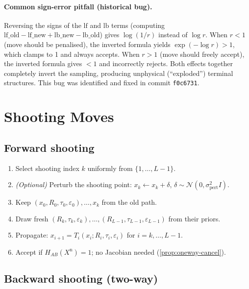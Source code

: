 \documentclass[11pt,a4paper]{article}
\newcommand{\N}{\mathcal{N}}
\newcommand{\HAB}{H_{AB}}
\newcommand{\Xnew}{X^{\mathrm{n}}}
\begin{document}
\paragraph{Common sign-error pitfall (historical bug).}
Reversing the signs of the $\mathrm{lf}$ and $\mathrm{lb}$ terms
(computing $\mathrm{lf\_old} - \mathrm{lf\_new} + \mathrm{lb\_new} -
\mathrm{lb\_old}$) gives $\log(1/r)$ instead of $\log r$.  When $r < 1$
(move should be penalised), the inverted formula yields
$\exp(-\log r) > 1$, which clamps to 1 and always accepts.  When $r > 1$
(move should freely accept), the inverted formula gives $< 1$ and
incorrectly rejects.  Both effects together completely invert the
sampling, producing unphysical (``exploded'') terminal structures.  This
bug was identified and fixed in commit \texttt{f0c6731}.

\section{Shooting Moves}
\label{sec:shooting}

\subsection{Forward shooting}
\label{sec:forward-shooting}

\begin{enumerate}
  \item Select shooting index $k$ uniformly from $\{1,\ldots,L-1\}$.
  \item \emph{(Optional)} Perturb the shooting point:
        $x_k \leftarrow x_k + \delta$, $\delta \sim \N(0,
        \sigma_{\mathrm{pert}}^2 I)$.
  \item Keep $(x_0,R_0,\tau_0,\varepsilon_0),\ldots,x_k$ from the old path.
  \item Draw fresh $(R_k, \tau_k, \varepsilon_k), \ldots,
        (R_{L-1}, \tau_{L-1}, \varepsilon_{L-1})$ from their priors.
  \item Propagate: $x_{i+1} = T_i(x_i; R_i, \tau_i, \varepsilon_i)$
        for $i = k, \ldots, L-1$.
  \item Accept if $\HAB(\Xnew) = 1$; no Jacobian needed
        (\cref{prop:oneway-cancel}).
\end{enumerate}

\subsection{Backward shooting (two-way)}
\label{sec:backward-shooting}
\end{document}
